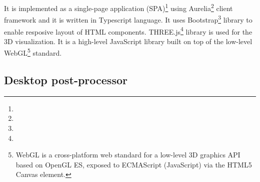 It is implemented as a single-page application (SPA)\footnote{} using Aurelia\footnote{} client framework and it is written in Typescript language. It uses Bootstrap\footnote{} library to enable resposive layout of HTML components. THREE.js\footnote{} library is used for the 3D visualization. It is a high-level JavaScript library built on top of the low-level WebGL\footnote{WebGL is a cross-platform web standard for a low-level 3D graphics API based on OpenGL ES, exposed to ECMAScript (JavaScript) via the HTML5 Canvas element.} standard.


\subsection*{Desktop post-processor}



